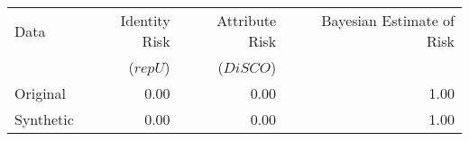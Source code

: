 \begin{tabular}{lrrr}
  \toprule
Data & Identity Risk  & Attribute Risk  & Bayesian Estimate of Risk \\ 
 & ($repU$) & ($DiSCO$) & \\
  \midrule
Original & 0.00 & 0.00 &  1.00 \\ 
  Synthetic & 0.00 & 0.00 & 1.00 \\ 
   \bottomrule
\end{tabular}
